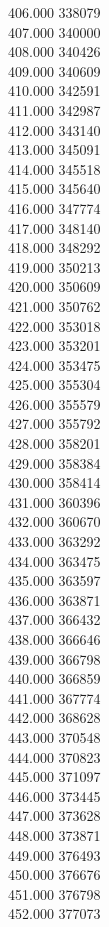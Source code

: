 { 406.000	338079 \\
 407.000	340000 \\
 408.000	340426 \\
 409.000	340609 \\
 410.000	342591 \\
 411.000	342987 \\
 412.000	343140 \\
 413.000	345091 \\
 414.000	345518 \\
 415.000	345640 \\
 416.000	347774 \\
 417.000	348140 \\
 418.000	348292 \\
 419.000	350213 \\
 420.000	350609 \\
 421.000	350762 \\
 422.000	353018 \\
 423.000	353201 \\
 424.000	353475 \\
 425.000	355304 \\
 426.000	355579 \\
 427.000	355792 \\
 428.000	358201 \\
 429.000	358384 \\
 430.000	358414 \\
 431.000	360396 \\
 432.000	360670 \\
 433.000	363292 \\
 434.000	363475 \\
 435.000	363597 \\
 436.000	363871 \\
 437.000	366432 \\
 438.000	366646 \\
 439.000	366798 \\
 440.000	366859 \\
 441.000	367774 \\
 442.000	368628 \\
 443.000	370548 \\
 444.000	370823 \\
 445.000	371097 \\
 446.000	373445 \\
 447.000	373628 \\
 448.000	373871 \\
 449.000	376493 \\
 450.000	376676 \\
 451.000	376798 \\
 452.000	377073 \\
}
